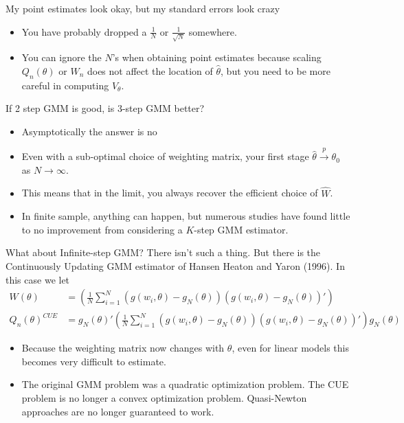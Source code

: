\documentclass[aspectratio=169]{beamer}
\begin{document}
\begin{frame}{My point estimates look okay, but my standard errors look crazy}
\begin{itemize}
\item You have probably dropped a $\frac{1}{N}$ or $\frac{1}{\sqrt{N}}$ somewhere.
\item  You can ignore the $N$'s when obtaining point estimates because scaling $Q_n(\theta)$ or $W_n$ does not affect the location of $\hat{\theta}$, but you need to be more careful in computing $V_{\theta}$.
\end{itemize}
\end{frame}

\begin{frame}{If 2 step GMM is good, is 3-step GMM better?}
\begin{itemize}
\item Asymptotically the answer is no
\item Even with a sub-optimal choice of weighting matrix, your first stage  $\hat{\theta} \overset{p}{\to}\theta_0$ as $N \rightarrow \infty$.
\item  This means that in the limit, you always recover the efficient choice of $\hat{W}$.
\item  In finite sample, anything can happen, but numerous studies have found little to no improvement from considering a $K$-step GMM estimator.
\end{itemize}
\end{frame}

\begin{frame}{What about Infinite-step GMM?}
 There isn't such a thing. But there is the \alert{Continuously Updating GMM} estimator of Hansen Heaton and Yaron (1996). In this case we let \\
\begin{align*}
W(\theta)&=\left(\frac{1}{N} \sum_{i=1}^N (g(w_i,\theta) - g_N(\theta)) (g(w_i,\theta)-g_N(\theta))' \right) \\
Q_n(\theta)^{CUE} &= g_N(\theta)' \left(\frac{1}{N} \sum_{i=1}^N (g(w_i,\theta) - g_N(\theta)) (g(w_i,\theta)-g_N(\theta))' \right) g_N(\theta)
\end{align*}
\begin{itemize}
\item Because the weighting matrix now changes with $\theta$, even for linear models this becomes very difficult to estimate. 
\item The original GMM problem was a quadratic optimization problem. The CUE problem is no longer a convex optimization problem. Quasi-Newton approaches are no longer guaranteed to work.
\end{itemize}
\end{frame}
\end{document}

